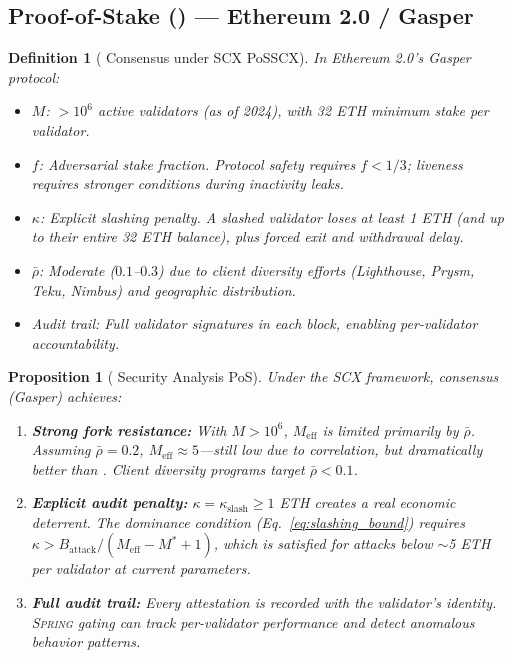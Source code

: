 \documentclass[11pt,a4paper]{article}
\newtheorem{proposition}[theorem]{Proposition}
\newtheorem{definition}[theorem]{Definition}
\theoremstyle{definition}
\newcommand{\Spring}{\textsc{Spring}}
\newcommand{\SCX}{\textsc{SCX}}
\newcommand{\mthreshold}{M^{*}}
\newcommand{\PoW}{\mathrm{PoW}}
\newcommand{\PoS}{\mathrm{PoS}}
\begin{document}
\subsection{Proof-of-Stake (\PoS{}) — Ethereum 2.0 / Gasper}
\begin{definition}[\PoS{} Consensus under \SCX{} PoSSCX]
\label{def:pos_scx}
In Ethereum 2.0's Gasper protocol:
\begin{itemize}
    \item $M$: $>10^6$ active validators (as of 2024), with 32 ETH minimum stake per validator.
    \item $f$: Adversarial stake fraction. Protocol safety requires $f < 1/3$; liveness requires stronger conditions during inactivity leaks.
    \item $\kappa$: Explicit slashing penalty. A slashed validator loses at least 1 ETH (and up to their entire 32 ETH balance), plus forced exit and withdrawal delay.
    \item $\bar{\rho}$: Moderate ($0.1$--$0.3$) due to client diversity efforts (Lighthouse, Prysm, Teku, Nimbus) and geographic distribution.
    \item Audit trail: Full validator signatures in each block, enabling per-validator accountability.
\end{itemize}
\end{definition}
\begin{proposition}[\PoS{} Security Analysis PoS]
\label{prop:pos_security}
Under the \SCX{} framework, \PoS{} consensus (Gasper) achieves:
\begin{enumerate}[label=(\roman*)]
    \item \textbf{Strong fork resistance:} With $M > 10^6$, $M_{\mathrm{eff}}$ is limited primarily by $\bar{\rho}$. Assuming $\bar{\rho} = 0.2$, $M_{\mathrm{eff}} \approx 5$—still low due to correlation, but dramatically better than \PoW{}. Client diversity programs target $\bar{\rho} < 0.1$.
    \item \textbf{Explicit audit penalty:} $\kappa = \kappa_{\mathrm{slash}} \geq 1$ ETH creates a real economic deterrent. The dominance condition (Eq.~\ref{eq:slashing_bound}) requires $\kappa > B_{\mathrm{attack}} / (M_{\mathrm{eff}} - \mthreshold + 1)$, which is satisfied for attacks below $\sim$5 ETH per validator at current parameters.
    \item \textbf{Full audit trail:} Every attestation is recorded with the validator's identity. \Spring{} gating can track per-validator performance and detect anomalous behavior patterns.
\end{enumerate}
\end{proposition}
\end{document}
